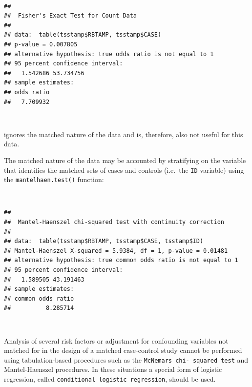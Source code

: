 \documentclass[12pt,a4paper]{book}
\newenvironment{Shaded}{\begin{snugshade}}{\end{snugshade}}
\newcommand{\KeywordTok}[1]{\textcolor[rgb]{0.13,0.29,0.53}{\textbf{#1}}}
\newcommand{\NormalTok}[1]{#1}
\newcommand{\OperatorTok}[1]{\textcolor[rgb]{0.81,0.36,0.00}{\textbf{#1}}}
\theoremstyle{definition}
\theoremstyle{definition}
\theoremstyle{definition}
\theoremstyle{remark}
\begin{document}
~

\begin{Shaded}
\end{Shaded}

\begin{verbatim}
## 
##  Fisher's Exact Test for Count Data
## 
## data:  table(tsstamp$RBTAMP, tsstamp$CASE)
## p-value = 0.007805
## alternative hypothesis: true odds ratio is not equal to 1
## 95 percent confidence interval:
##   1.542686 53.734756
## sample estimates:
## odds ratio 
##   7.709932
\end{verbatim}

~

ignores the matched nature of the data and is, therefore, also not
useful for this data.

The matched nature of the data may be accounted by stratifying on the
variable that identifies the matched sets of cases and controls
(i.e.~the \texttt{ID} variable) using the \texttt{mantelhaen.test()}
function:

~

\begin{Shaded}
\end{Shaded}

\begin{verbatim}
## 
##  Mantel-Haenszel chi-squared test with continuity correction
## 
## data:  table(tsstamp$RBTAMP, tsstamp$CASE, tsstamp$ID)
## Mantel-Haenszel X-squared = 5.9384, df = 1, p-value = 0.01481
## alternative hypothesis: true common odds ratio is not equal to 1
## 95 percent confidence interval:
##   1.589505 43.191463
## sample estimates:
## common odds ratio 
##          8.285714
\end{verbatim}

~

Analysis of several risk factors or adjustment for confounding variables
not matched for in the design of a matched case-control study cannot be
performed using tabulation-based procedures such as the
\texttt{McNemar\textquotesingle{}s\ chi-\ squared\ test} and
Mantel-Haenszel procedures. In these situations a special form of
logistic regression, called \texttt{conditional\ logistic\ regression},
should be used.
\end{document}
